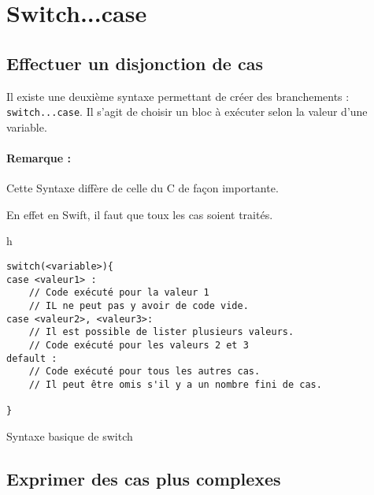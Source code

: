 \section{Switch...case}
\subsection{Effectuer un disjonction de cas}
Il existe une deuxième syntaxe permettant de créer des branchements :
\texttt{switch...case}.
Il s'agit de choisir un bloc à exécuter selon la valeur d'une variable.
\paragraph{Remarque :}Cette Syntaxe diffère de celle du C de façon importante.


En effet en Swift, il faut que toux les cas soient traités.
\begin{listing}{h}
\begin{verbatim}
switch(<variable>){
case <valeur1> :
    // Code exécuté pour la valeur 1
    // IL ne peut pas y avoir de code vide.
case <valeur2>, <valeur3>:
    // Il est possible de lister plusieurs valeurs.
    // Code exécuté pour les valeurs 2 et 3
default :
    // Code exécuté pour tous les autres cas.
    // Il peut être omis s'il y a un nombre fini de cas.

}
\end{verbatim}
\caption{Syntaxe basique de switch}
\end{listing}
\subsection{Exprimer des cas plus complexes}

